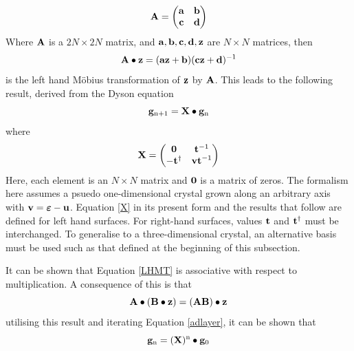 \documentclass[a4paper, 12pt]{article}
\begin{document}
\begin{equation}
\bf{A} = \begin{pmatrix} \bf{a}&\bf{b}\\ \bf{c}&\bf{d} \end{pmatrix}
\end{equation}
Where $\bf{A}$ is a $2N \times 2N$ matrix, and $\bf{a}, \bf{b}, \bf{c}, \bf{d}, \bf{z}$ are $N \times N$ matrices, then
\begin{equation}\label{LHMT}
\bf{A \bullet z} = (\bf{az} + \bf{b})(\bf{cz} + \bf{d})^{\rm -1}
\end{equation}
is the left hand M\"{o}bius transformation of $\bf z$ by $\bf A$.
This leads to the following result, derived from the Dyson equation
\begin{equation}
	{\bf g}_{{\rm n}+1} = {\bf X}\bullet {\bf g}_{\rm n}
\end{equation}
where
\begin{equation}\label{X}
	\bf{X} = \begin{pmatrix} \bf0&\bf{t}^{\rm{-1}}\\-\bf{t}^{\rm{\dag}}&\bf{vt}^{\rm{-1}} \end{pmatrix}
\end{equation}
Here, each element is an $N \times N$ matrix and $\bf{0}$ is a matrix of zeros. The formalism here assumes a psuedo one-dimensional crystal grown along an arbitrary axis with ${\bf v} = \bm\varepsilon - {\bf u}$. Equation \eqref{X} in its present form and the results that follow are defined for left hand surfaces. For right-hand surfaces, values $\bf{t}$ and $\bf{t}^{\rm{\dag}}$ must be interchanged.
To generalise to a three-dimensional crystal, an alternative basis must be used such as that defined at the beginning of this subsection.
\\\par It can be shown that Equation \eqref{LHMT} is associative with respect to multiplication. A consequence of this is that 
\begin{equation}
\bf A\bullet(B\bullet z) = (AB)\bullet z
\end{equation}
utilising this result and iterating Equation \eqref{adlayer}, it can be shown that
\begin{equation}\label{bigG}
	{\bf g}_{\rm n} = ({\bf X})^{\rm n}\bullet {\bf g}_0
\end{equation}
\end{document}
